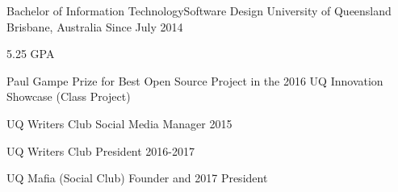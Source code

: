 


\begin{cventries}


\cventry
{Bachelor of Information Technology{\enskip\cdotp\enskip}Software Design} %
{University of Queensland} %
{Brisbane, Australia} %
{Since July 2014} %
{ %
\begin{cvitems}
\item 5.25 GPA
\item {Paul Gampe Prize for Best Open Source Project in the 2016 UQ Innovation Showcase (Class Project)}
\item {UQ Writers Club Social Media Manager 2015}
\item {UQ Writers Club President 2016-2017}
\item {UQ Mafia (Social Club) Founder and 2017 President}
\end{cvitems}
}


\end{cventries}